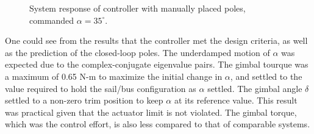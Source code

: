 \documentclass[]{aiaa-tc}%
\begin{document}
	\begin{figure}[H]
		\centering
		\caption{System response of controller with manually placed poles, commanded $\alpha=35^{\circ}$. }
		\label{fig:Controller1}
	\end{figure}	

	One could see from the results that the controller met the design criteria, as well as the prediction of the closed-loop poles. The underdamped motion of $\alpha$ was expected due to the complex-conjugate eigenvalue pairs. The gimbal tourque was a maximum of 0.65 N-m to maximize the initial change in $\alpha$, and settled to the value required to hold the sail/bus configuration as $\alpha$ settled. The gimbal angle $\delta$ settled to a non-zero trim position to keep $\alpha$ at its reference value. This result was practical given that the actuator limit is not violated. The gimbal torque, which was the control effort, is also less compared to that of comparable systems\cite{WieSolarSail2}.
\end{document}
